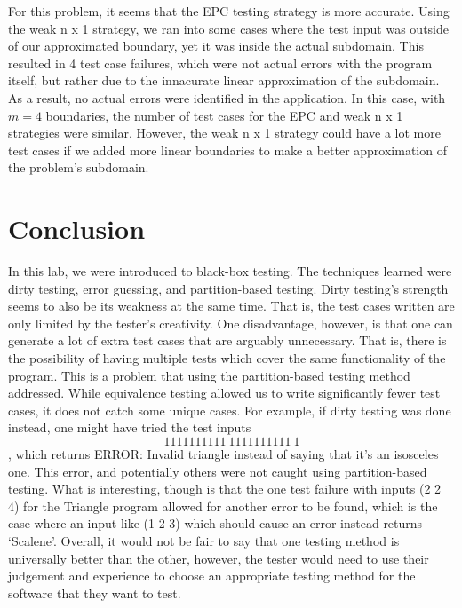\documentclass[letterpaper]{article}
\begin{document}
For this problem, it seems that the EPC testing strategy is more accurate.
Using the weak n x 1 strategy, we ran into some cases where the test input
was outside of our approximated boundary, yet it was inside the actual
subdomain. This resulted in 4 test case failures, which were not actual
errors with the program itself, but rather due to the innacurate linear
approximation of the subdomain. As a result, no actual errors were identified 
in the application. In this case, with $m=4$ boundaries, the number of test
cases for the EPC and weak n x 1 strategies were similar. However, 
the weak n x 1 strategy could have a lot more test cases if we added more 
linear boundaries to make a better approximation of the problem's subdomain.

\section{Conclusion}
In this lab, we were introduced to black-box testing. The techniques
learned were dirty testing, error guessing, and partition-based testing.
Dirty testing's strength seems to also be its weakness at the same time. That is,
the test cases written are only limited by the tester's creativity.
One disadvantage, however, is that one can generate a lot of extra test cases
that are arguably unnecessary. That is, there is the possibility of having multiple
tests which cover the same functionality of the program. This is a problem that
using the partition-based testing method addressed. While equivalence testing allowed us 
to write significantly fewer test cases,
it does not catch some unique cases. For example, if dirty testing was done instead,
one might have tried the test inputs $$1111111111\ 1111111111\ 1$$, which returns ERROR: Invalid triangle
instead of saying that it's an isosceles one. This error, and potentially others were not
caught using partition-based testing. What is interesting, though is that the one
test failure with inputs (2 2 4) for the Triangle program allowed for another error to be found, which is
the case where an input like (1 2 3) which should cause an error instead returns `Scalene'.
Overall, it would not be fair to say that
one testing method is universally better than the other, however, the tester would
need to use their judgement and experience to choose an appropriate testing method
for the software that they want to test.

\vfill
\appendix






\end{document}
